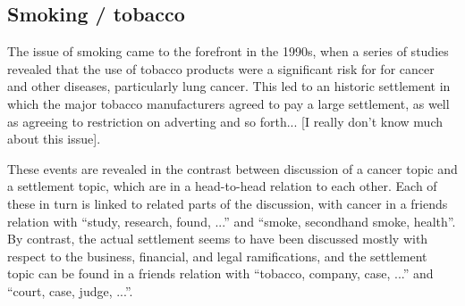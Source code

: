 
\subsection{Smoking / tobacco}




The issue of smoking came to the forefront in the 1990s, when a series of studies revealed that the use of tobacco products were a significant risk for for cancer and other diseases, particularly lung cancer. This led to an historic settlement in which the major tobacco manufacturers agreed to pay a large settlement, as well as agreeing to restriction on adverting and so forth... [I really don't know much about this issue].

These events are revealed in the contrast between discussion of a cancer  topic  and a settlement topic, which are in a head-to-head relation to each other. Each of these in turn is linked to related parts of the discussion, with cancer in a friends relation with ``study, research, found, ...'' and ``smoke, secondhand smoke, health''. By contrast, the actual settlement seems to have been discussed mostly with respect to the business, financial, and legal ramifications, and the settlement topic can be found in a friends relation with ``tobacco, company, case, ...'' and ``court, case, judge, ...''.

